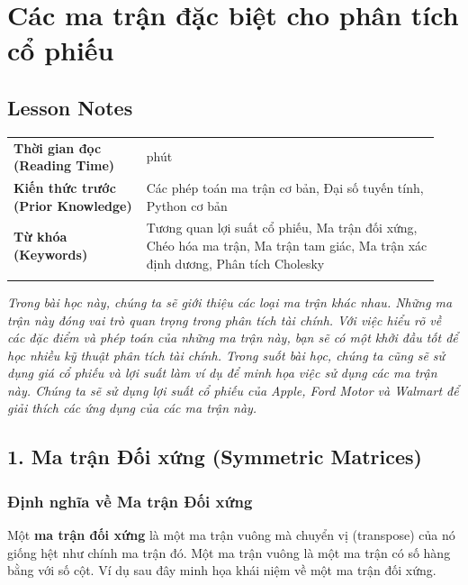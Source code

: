 \chapter{Các ma trận đặc biệt cho phân tích cổ phiếu}
\label{ch:M2L3}


\section*{Lesson Notes}

{\small
\begin{longtable}{>{\raggedright\arraybackslash}p{0.292\linewidth}>{\raggedright\arraybackslash}p{0.648\linewidth}}
\toprule
\textbf{Thời gian đọc (Reading Time)} & 60 phút \\
\addlinespace[2pt]
\textbf{Kiến thức trước (Prior Knowledge)} & Các phép toán ma trận cơ bản, Đại số tuyến tính, Python cơ bản \\
\addlinespace[2pt]
\textbf{Từ khóa (Keywords)} & Tương quan lợi suất cổ phiếu, Ma trận đối xứng, Chéo hóa ma trận, Ma trận tam giác, Ma trận xác định dương, Phân tích Cholesky \\
\addlinespace[2pt]
\bottomrule
\end{longtable}
}

\emph{Trong bài học này, chúng ta sẽ giới thiệu các loại ma trận khác nhau. Những ma trận này đóng vai trò quan trọng trong phân tích tài chính. Với việc hiểu rõ về các đặc điểm và phép toán của những ma trận này, bạn sẽ có một khởi đầu tốt để học nhiều kỹ thuật phân tích tài chính. Trong suốt bài học, chúng ta cũng sẽ sử dụng giá cổ phiếu và lợi suất làm ví dụ để minh họa việc sử dụng các ma trận này. Chúng ta sẽ sử dụng lợi suất cổ phiếu của Apple, Ford Motor và Walmart để giải thích các ứng dụng của các ma trận này.}

\section{1. Ma trận Đối xứng (Symmetric Matrices)}

\subsection{Định nghĩa về Ma trận Đối xứng}

Một \textbf{ma trận đối xứng} là một ma trận vuông mà chuyển vị (transpose) của nó giống hệt như chính ma trận đó. Một ma trận vuông là một ma trận có số hàng bằng với số cột. Ví dụ sau đây minh họa khái niệm về một ma trận đối xứng.

